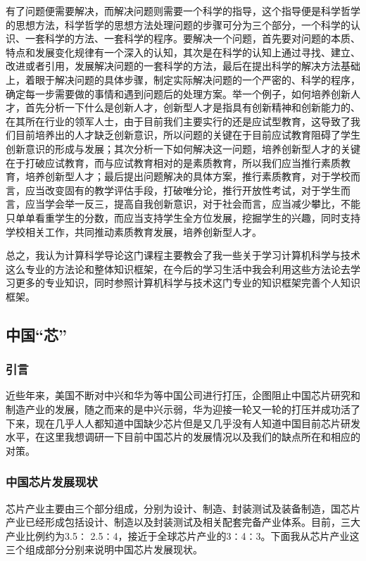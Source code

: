 \documentclass{article}
\begin{document}
有了问题便需要解决，而解决问题则需要一个科学的指导，这个指导便是科学哲学的思想方法，科学哲学的思想方法处理问题的步骤可分为三个部分，一个科学的认识、一套科学的方法、一套科学的程序。要解决一个问题，首先要对问题的本质、特点和发展变化规律有一个深入的认知，其次是在科学的认知上通过寻找、建立、改进或者引用，发展解决问题的一套科学的方法，最后在提出科学的解决方法基础上，着眼于解决问题的具体步骤，制定实际解决问题的一个严密的、科学的程序，确定每一步需要做的事情和遇到问题后的处理方案。举一个例子，如何培养创新人才，首先分析一下什么是创新人才，创新型人才是指具有创新精神和创新能力的、在其所在行业的领军人士，由于目前我们主要实行的还是应试型教育，这导致了我们目前培养出的人才缺乏创新意识，所以问题的关键在于目前应试教育阻碍了学生创新意识的形成与发展；其次分析一下如何解决这一问题，培养创新型人才的关键在于打破应试教育，而与应试教育相对的是素质教育，所以我们应当推行素质教育，培养创新型人才；最后提出问题解决的具体方案，推行素质教育，对于学校而言，应当改变固有的教学评估手段，打破唯分论，推行开放性考试，对于学生而言，应当学会举一反三，提高自我创新意识，对于社会而言，应当减少攀比，不能只单单看重学生的分数，而应当支持学生全方位发展，挖掘学生的兴趣，同时支持学校相关工作，共同推动素质教育发展，培养创新型人才。
\par

总之，我认为计算科学导论这门课程主要教会了我一些关于学习计算机科学与技术这么专业的方法论和整体知识框架，在今后的学习生活中我会利用这些方法论去学习更多的专业知识，同时参照计算机科学与技术这门专业的知识框架完善个人知识框架。

\subsection{中国“芯”}

\subsubsection{引言}
近些年来，美国不断对中兴和华为等中国公司进行打压，企图阻止中国芯片研究和制造产业的发展，随之而来的是中兴示弱，华为迎接一轮又一轮的打压并成功活了下来，现在几乎人人都知道中国缺少芯片但是又几乎没有人知道中国目前芯片研发水平，在这里我想调研一下目前中国芯片的发展情况以及我们的缺点所在和相应的对策。
\par

\subsubsection{中国芯片发展现状}
芯片产业主要由三个部分组成，分别为设计、制造、封装测试及装备制造，国芯片产业已经形成包括设计、制造以及封装测试及相关配套完备产业体系。目前，三大产业比例约为3.5∶
2.5∶4，接近于全球芯片产业的3∶4∶3。\citep{xinpian}下面我从芯片产业这三个组成部分分别来说明中国芯片发展现状。
\par
\end{document}
